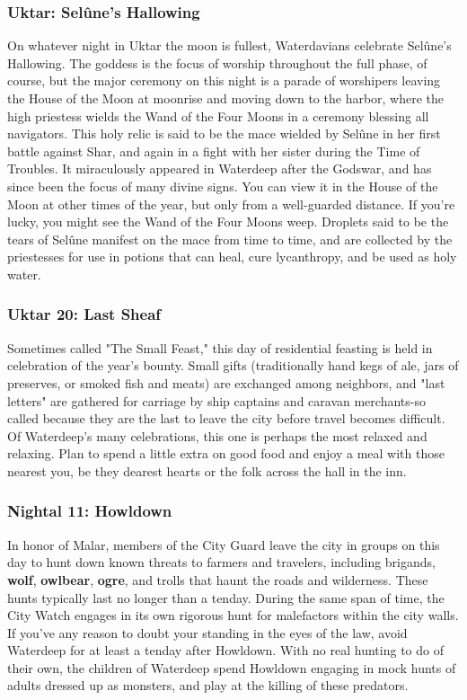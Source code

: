 \documentclass[10pt,a4paper,twoside,twocolumn,openany,nodeprecatedcode]{dndbook}
\begin{document}
\subsubsection{Uktar: Selûne's Hallowing}
On whatever night in Uktar the moon is fullest, Waterdavians celebrate Selûne's Hallowing. The goddess is the focus of worship throughout the full phase, of course, but the major ceremony on this night is a parade of worshipers leaving the House of the Moon at moonrise and moving down to the harbor, where the high priestess wields the Wand of the Four Moons in a ceremony blessing all navigators. This holy relic is said to be the mace wielded by Selûne in her first battle against Shar, and again in a fight with her sister during the Time of Troubles. It miraculously appeared in Waterdeep after the Godswar, and has since been the focus of many divine signs. You can view it in the House of the Moon at other times of the year, but only from a well-guarded distance.
If you're lucky, you might see the Wand of the Four Moons weep. Droplets said to be the tears of Selûne manifest on the mace from time to time, and are collected by the priestesses for use in potions that can heal, cure lycanthropy, and be used as holy water.
\subsubsection{Uktar 20: Last Sheaf}
Sometimes called "The Small Feast," this day of residential feasting is held in celebration of the year's bounty. Small gifts (traditionally hand kegs of ale, jars of preserves, or smoked fish and meats) are exchanged among neighbors, and "last letters" are gathered for carriage by ship captains and caravan merchants-so called because they are the last to leave the city before travel becomes difficult. Of Waterdeep's many celebrations, this one is perhaps the most relaxed and relaxing. Plan to spend a little extra on good food and enjoy a meal with those nearest you, be they dearest hearts or the folk across the hall in the inn.
\subsubsection{Nightal 11: Howldown}
In honor of Malar, members of the City Guard leave the city in groups on this day to hunt down known threats to farmers and travelers, including brigands, \textbf{wolf}, \textbf{owlbear}, \textbf{ogre}, and trolls that haunt the roads and wilderness. These hunts typically last no longer than a tenday. During the same span of time, the City Watch engages in its own rigorous hunt for malefactors within the city walls. If you've any reason to doubt your standing in the eyes of the law, avoid Waterdeep for at least a tenday after Howldown.
With no real hunting to do of their own, the children of Waterdeep spend Howldown engaging in mock hunts of adults dressed up as monsters, and play at the killing of these predators.
\end{document}
